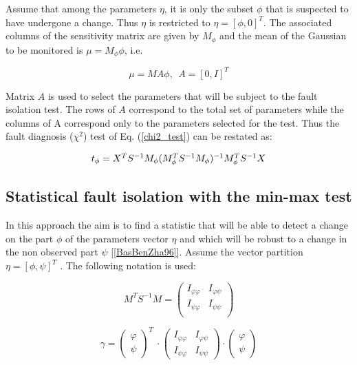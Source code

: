 \documentclass[journal]{IEEEtran}
\begin{document}
\noindent Assume that among the parameters $\eta$, it is only the subset $\phi$ that is suspected to have undergone a change. Thus $\eta$ is restricted to $\eta=[\phi,0]^T$. The associated columns of the sensitivity matrix are given by $M_{\phi}$ and the mean of the Gaussian to be monitored is $\mu=M_{\phi}{\phi}$, i.e.

\begin{equation}
\mu=MA{\phi},  \ \
A=[0, I]^T
\end{equation}

\noindent Matrix $A$ is used to select the parameters that will be subject to the fault isolation test. The rows of
$A$ correspond to the total set of parameters while the columns of A correspond only to the parameters selected for
the test. Thus the fault diagnosis ($\chi^2$) test of Eq. (\ref{chi2_test}) can be restated as:

\begin{equation} \label{chi2_test_sensitivity}
\begin{tabular}{c}
$t_{\phi}={X^T}S^{-1}{M_{\phi}}({M_{\phi}^T}{S^{-1}}M_{\phi})^{-1}{M_{\phi}^T}{S^{-1}X}$
\end{tabular}
\end{equation}

\subsection{Statistical fault isolation with the min-max test\\}

\noindent In this approach the aim is to find a statistic that will be able to detect a change on the part $\phi$ of the
parameters vector $\eta$ and which will be robust to a change in the non observed part $\psi$ [\ref{BasBenZha96}]. Assume the
vector partition $\eta=[\phi,\psi]^T$ . The following notation is used:

\begin{equation}
{M^T}{S^{-1}}M=
\begin{pmatrix}
I_{\varphi\varphi} & I_{\varphi\psi} \\
I_{\psi\varphi}    & I_{\psi\psi}    \\
\end{pmatrix}
\end{equation}

\begin{equation}
\gamma=
\begin{pmatrix}
\varphi \\ \psi
\end{pmatrix}^T \ \cdot
\begin{pmatrix}
I_{\varphi\varphi} & I_{\varphi\psi} \\
I_{\psi\varphi}    & I_{\psi\psi}
\end{pmatrix}  \cdot
\begin{pmatrix}
\varphi \\ \psi
\end{pmatrix}
\end{equation}
\end{document}
